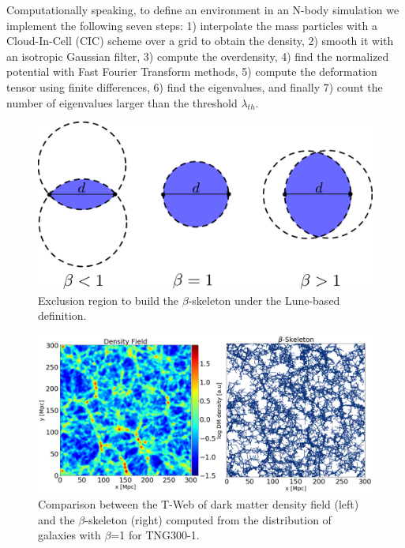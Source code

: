 \documentclass[usenatbib]{mnras}
\begin{document}
Computationally speaking, to define an environment in an N-body
simulation we implement the following seven steps: 1) interpolate the
mass particles with a Cloud-In-Cell (CIC) scheme over a grid to
obtain the density, 2) smooth it with an isotropic Gaussian filter,
3) compute the overdensity, 4) find the normalized potential with Fast
Fourier Transform  methods, 5) compute the deformation tensor using
finite differences, 6) find the eigenvalues, and finally 7) count the
number of eigenvalues larger than the threshold $\lambda_{th}$.  

\begin{figure}
\centering
 \includegraphics[scale=0.18]{Figs/p_beta.pdf}
 \caption{Exclusion region to build the $\beta$-skeleton under the Lune-based definition.}  
 \label{fig:beta}
\end{figure}


\begin{figure}
\centering
 \includegraphics[scale=0.3]{Figs/p_Fig1_.png}%
 \caption{Comparison between the T-Web of dark matter density field
   (left) and the $\beta$-skeleton (right) computed from the
   distribution of galaxies with $\beta$=1 for TNG300-1.}  
 \label{fig:TWebBsk}
\end{figure}
\end{document}
